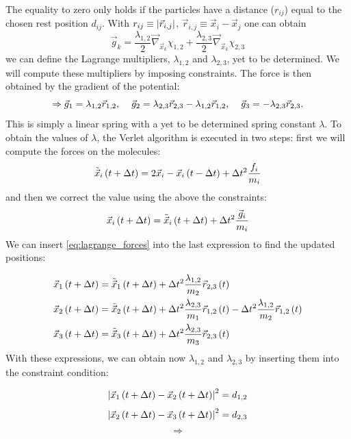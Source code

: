 The equality to zero only holds if the particles have a distance ($r_{ij}$)  equal to the chosen rest position $d_{ij}$. With $r_{ij}\equiv \left|\vec{r}_{i,j}\right|$, $\vec{r}_{i,j} \equiv \vec{x}_{i}  -\vec{x}_{j} $ one can obtain
  $$ \vec{g}_k = \frac{\lambda_{1,2} }{2} \vec{\nabla} _{\vec{x}_k} \chi_{1,2}+
                   \frac{\lambda_{2,3} }{2} \vec{\nabla} _{\vec{x}_k} \chi_{2,3}
 $$ we can define the Lagrange multipliers, $\lambda_{1,2}$ and $\lambda_{2,3}$, yet to be determined. We will compute these multipliers by imposing constraints. The force is then obtained by the gradient of the potential:
 \begin{equation}
 \Rightarrow \vec{g}_1 = \lambda_{1,2} \vec{r}_{1,2}, \hspace{0.4cm} 
\vec{g}_2 = \lambda_{2,3} \vec{r}_{2,3} - \lambda_{1,2} \vec{r}_{1,2}, \hspace{0.4cm} 
\vec{g}_3 = - \lambda_{2,3} \vec{r}_{2,3}.
\label{eq:lagrange_forces}
\end{equation}
 This is simply a linear spring with a  yet to be determined spring constant $\lambda$. To obtain the values of $\lambda$, the Verlet algorithm is executed in two steps: first we will compute the forces on the molecules:
 $$
\tilde{\vec{x}}_i \left(t+\Delta t\right) = 2\vec{x}_i  - \vec{x}_i\left(t-\Delta t\right) + \Delta t ^2 \frac{f_i}{m_i} 
$$ 
and then we correct the value using the above the constraints:
$$
\vec{x}_i \left(t+\Delta t\right) = \tilde{\vec{x}}_i \left(t+\Delta t\right) + \Delta t ^2 \frac{\vec{g}_i}{m_i} 
$$
We can insert \eqref{eq:lagrange_forces} into the last expression to find the updated positions:

\begin{align}
\vec{x}_1 \left(t+\Delta t\right) &= \tilde{\vec{x}}_1 \left(t+\Delta t\right) + \Delta t ^2 \frac{\lambda_{1,2}}{m_2} \vec{r}_{2,3}\left(t\right)\\
\vec{x}_2 \left(t+\Delta t\right) &= \tilde{\vec{x}}_2 \left(t+\Delta t\right) + \Delta t ^2 \frac{\lambda_{2,3}}{m_1} \vec{r}_{1,2}\left(t\right) -  \Delta t ^2 \frac{\lambda_{1,2}}{m_2} \vec{r}_{1,2}\left(t\right)\\
\vec{x}_3 \left(t+\Delta t\right) &= \tilde{\vec{x}}_3 \left(t+\Delta t\right) + \Delta t ^2 \frac{\lambda_{2,3}}{m_3} \vec{r}_{2,3}\left(t\right)
\end{align}
With these expressions, we can obtain now $\lambda_{1,2}$ and $\lambda_{2,3}$ by inserting them into the constraint condition:

$$
\left|\vec{x}_1 \left(t+\Delta t\right) - \vec{x}_2 \left(t+\Delta t\right)\right|^2 = d_{1,2}
$$
$$
\left|\vec{x}_2 \left(t+\Delta t\right) - \vec{x}_3 \left(t+\Delta t\right)\right|^2 = d_{2,3}
$$
$$
\Rightarrow
$$


